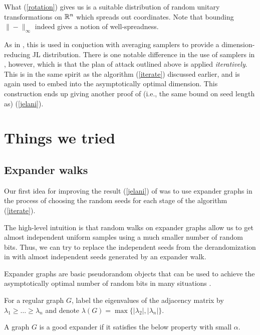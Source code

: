 What (\ref{rotation}) gives us is a suitable distribution of random
unitary transformations on $\mathbb{R}^n$ which spreads out coordinates. Note
that bounding $\|{-}\|_\infty$ indeed gives a notion of
well-spreadness.

As in \cite{karnin2011explicit}, this is used in conjuction with
averaging samplers to provide a dimension-reducing JL
distribution. There is one notable difference in the use of samplers
in \cite{kane-2011}, however, which is that the plan of attack
outlined above is applied \emph{iteratively}. This is in the same
spirit as the algorithm (\ref{iterate}) discussed earlier, and is
again used to embed into the asymptotically optimal dimension. This
construction ends up giving another proof of (i.e., the same bound on
seed length as) (\ref{jelani}).


\section{Things we tried}

\subsection{Expander walks}

Our first idea for improving the result (\ref{jelani}) of
\cite{kane-2011} was to use expander graphs in the process of choosing
the random seeds for each stage of the algorithm (\ref{iterate}).

The high-level intuition is that random walks on expander graphs allow
us to get almost independent uniform samples using a much smaller
number of random bits. Thus, we can try to replace the independent
seeds from the derandomization in \cite{kane-2011} with almost
independent seeds generated by an expander walk.

Expander graphs are basic pseudorandom objects that can be used to
achieve the asymptotically optimal number of random bits in many
situations \cite{hoory2006expander}.

\begin{notation}
  For a regular graph $G$, label the eigenvalues of the adjacency
  matrix by $\lambda_1\ge\ldots\ge\lambda_n$ and denote
  $\lambda(G)=\max\{|\lambda_2|,|\lambda_n|\}$.
\end{notation}

A graph $G$ is a good expander if it satisfies the below property with
small $\alpha$.

